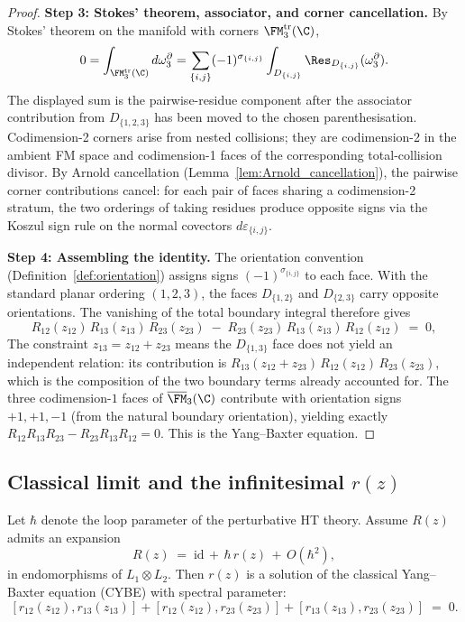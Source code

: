 \begin{proof}
\noindent\textbf{Step 3: Stokes' theorem, associator, and corner cancellation.}
By Stokes' theorem on the manifold with corners
\(\FM^{\mathrm{tr}}_3(\C)\),
\[
0 = \int_{\FM^{\mathrm{tr}}_3(\C)} d\omega_3^{\partial}
 = \sum_{\{i,j\}} (-1)^{\sigma_{\{i,j\}}}
 \int_{D_{\{i,j\}}} \Res_{D_{\{i,j\}}}(\omega_3^{\partial}).
\]
The displayed sum is the pairwise-residue component after the
associator contribution from \(D_{\{1,2,3\}}\) has been moved to the
chosen parenthesisation.  Codimension-2 corners arise from nested
collisions; they are codimension-2 in the ambient FM space and
codimension-1 faces of the corresponding total-collision divisor.  By
Arnold cancellation (Lemma~\ref{lem:Arnold_cancellation}), the
pairwise corner contributions cancel: for each pair of faces sharing a
codimension-2 stratum, the two orderings of taking residues produce
opposite signs via the Koszul sign rule on the normal covectors
\(d\varepsilon_{\{i,j\}}\).

\medskip
\noindent\textbf{Step 4: Assembling the identity.}
The orientation convention (Definition~\ref{def:orientation}) assigns signs $(-1)^{\sigma_{\{i,j\}}}$ to each face. With the standard planar ordering $(1,2,3)$, the faces $D_{\{1,2\}}$ and $D_{\{2,3\}}$ carry opposite orientations. The vanishing of the total boundary integral therefore gives
\[
R_{12}(z_{12})\,R_{13}(z_{13})\,R_{23}(z_{23}) \;-\; R_{23}(z_{23})\,R_{13}(z_{13})\,R_{12}(z_{12}) \;=\; 0,
\]
The constraint $z_{13} = z_{12} + z_{23}$ means the $D_{\{1,3\}}$ face does not yield an independent relation: its contribution is $R_{13}(z_{12}+z_{23})\,R_{12}(z_{12})\,R_{23}(z_{23})$, which is the composition of the two boundary terms already accounted for. The three codimension-$1$ faces of $\overline{\FM}_3(\C)$ contribute with orientation signs $+1, +1, -1$ (from the natural boundary orientation), yielding exactly $R_{12}R_{13}R_{23} - R_{23}R_{13}R_{12} = 0$. This is the Yang--Baxter equation.
\end{proof}

\subsection{Classical limit and the infinitesimal $r(z)$}
Let $\hbar$ denote the loop parameter of the perturbative HT theory.
Assume $R(z)$ admits an expansion
\[
R(z) \;=\; \mathrm{id} \,+\, \hbar\, r(z) \,+\, O(\hbar^2),
\]
in endomorphisms of $L_1\otimes L_2$.
Then $r(z)$ is a solution of the classical Yang–Baxter equation (CYBE) with spectral parameter:
\[
[ r_{12}(z_{12}), r_{13}(z_{13}) ] + [ r_{12}(z_{12}), r_{23}(z_{23}) ] + [ r_{13}(z_{13}), r_{23}(z_{23}) ] \;=\; 0.
\]

